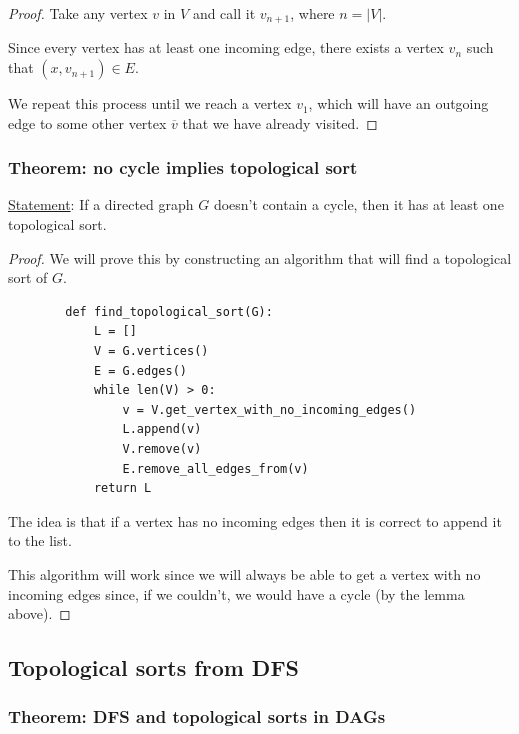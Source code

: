 \documentclass[10pt]{extarticle}
\begin{document}
\begin{proof}
    Take any vertex $v$ in $V$ and call it $v_{n+1}$, where $n = |V|$.

    Since every vertex has at least one incoming edge, there exists a vertex $v_n$ such that $(x, v_{n+1}) \in E$.

    We repeat this process until we reach a vertex $v_1$, which will have an outgoing edge to some other vertex $\overline{v}$ that we have already visited.
\end{proof}

\subsubsection{Theorem: no cycle implies topological sort}

\underline{Statement}: If a directed graph $G$ doesn't contain a cycle,
then it has at least one topological sort.

\begin{proof}
    We will prove this by constructing an algorithm that will find a topological sort of $G$.

    \begin{verbatim}
        def find_topological_sort(G):
            L = []
            V = G.vertices()
            E = G.edges()
            while len(V) > 0:
                v = V.get_vertex_with_no_incoming_edges()
                L.append(v)
                V.remove(v)
                E.remove_all_edges_from(v)
            return L
    \end{verbatim}

    The idea is that if a vertex has no incoming edges then it is correct to append it to the list.

    This algorithm will work since we will always be able to get a vertex with no incoming edges since, if we couldn't, we would have a cycle (by the lemma above).

\end{proof}

\subsection{Topological sorts from DFS}

\subsubsection{Theorem: DFS and topological sorts in DAGs}
\end{document}
